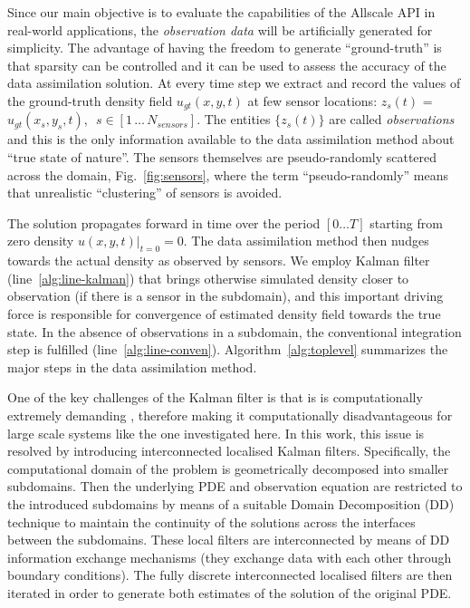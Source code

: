 \documentclass[acmsmall,review,anonymous]{acmart}\settopmatter{printfolios=true,printccs=false,printacmref=false}
\begin{document}
Since our main objective is to evaluate the capabilities of the Allscale API in real-world applications, the \textit{observation data} will be artificially generated for simplicity. The advantage of having the freedom to generate ``ground-truth'' is that sparsity can be controlled and it can be used to assess the accuracy of the data assimilation solution.  At every time step we extract and record the values of the ground-truth density field $u_{gt}(x,y,t)$ at few sensor locations: $z_s(t)$ = $u_{gt}(x_s,y_s,t)$, $\,\,s \in [1\,{\ldots}\,N_{sensors}]$. The entities $\{z_s(t)\}$ are called \textit{observations} and this is the only information available to the data assimilation method about ``true state of nature''. The sensors themselves are pseudo-randomly scattered across the domain, Fig.~\ref{fig:sensors}, where the term ``pseudo-randomly'' means that unrealistic ``clustering'' of sensors is avoided. 

The solution propagates forward in time over the period $[0 \ldots T]$ starting from zero density $u(x,y,t)\rvert_{t=0} = 0$. The data assimilation method then nudges towards the actual density as observed by sensors. We employ Kalman filter (line~\ref{alg:line-kalman}) that brings otherwise simulated density closer to observation (if there is a sensor in the subdomain), and this important driving force is responsible for convergence of estimated density field towards the true state. In the absence of observations in a subdomain, the conventional integration step is fulfilled (line~\ref{alg:line-conven}).  Algorithm~\ref{alg:toplevel} summarizes the major steps in the data assimilation method.

One of the key challenges of the Kalman filter is that is is computationally extremely demanding  \cite{verhaegen1986numerical}, therefore  making it computationally disadvantageous for large scale systems like the one investigated here.
In this work, this issue is resolved by introducing interconnected localised Kalman filters. Specifically, the computational domain of the problem is geometrically decomposed into smaller subdomains. Then the underlying PDE and observation equation are restricted to the introduced subdomains by means of a suitable Domain Decomposition (DD) technique to maintain the continuity of the solutions across the interfaces between the subdomains. These local filters are interconnected by means of DD information exchange mechanisms (they exchange data with each other through boundary conditions). The fully discrete interconnected localised filters are then iterated in order to generate both estimates of the solution of the original PDE.
\end{document}
